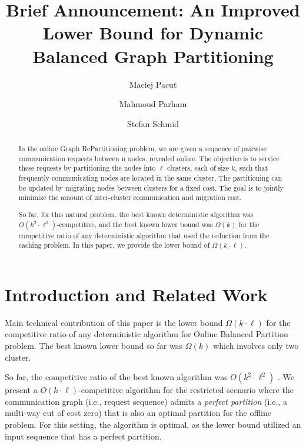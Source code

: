 \documentclass[manuscript,screen=true]{acmart}
\title{Brief Announcement: An Improved Lower Bound for Dynamic Balanced Graph Partitioning}
\author{Maciej Pacut}
\affiliation{%
  \institution{Faculty of Computer Science, University of Vienna}
  \country{Austria}
}
\author{Mahmoud Parham}
\affiliation{%
  \institution{Faculty of Computer Science, University of Vienna}
  \country{Austria}
}
\author{Stefan Schmid}
\affiliation{%
  \institution{Faculty of Computer Science, University of Vienna}
  \country{Austria}
}
\begin{document}
\begin{abstract}
  In the online Graph RePartitioning problem, we are given a sequence of pairwise communication requests between n nodes, revealed online.
  The objective is to service these requests by partitioning the nodes into $\ell$ clusters, each of size $k$, such that frequently communicating nodes are located in the same cluster.
  The partitioning can be updated by migrating nodes between clusters for a fixed cost.
  The goal is to jointly minimize the amount of inter-cluster communication and migration cost.

  So far, for this natural problem, the best known deterministic algorithm was $O(k^2\cdot \ell^2)$-competitive, and the best known lower bound was $\Omega(k)$ for the competitive ratio of any deterministic algorithm that used the reduction from the caching problem.
  In this paper, we provide the lower bound of $\Omega(k\cdot \ell)$.
\end{abstract}
    
\maketitle
    
\renewcommand{\shortauthors}{M.~Pacut, M.~Parham, S.~Schmid}

\section{Introduction and Related Work}


Main technical contribution of this paper is the lower bound $\Omega(k\cdot\ell)$ for the competitive ratio of any deterministic algorithm for Online Balanced Partition problem.
The best known lower bound so far was $\Omega(k)$ \cite{repartition-disc}
which involves only two cluster.


So far, the competitive ratio of the best known algorithm was $O(k^2\cdot \ell^2)$ \cite{repartition-disc}.
We present a $O(k\cdot \ell)$-competitive algorithm for the restricted scenario
where the communication graph (i.e., request sequence) admits a \emph{perfect partition} (i.e., a multi-way cut of cost zero) that is also an optimal partition for the offline problem.
For this setting, the algorithm is optimal, as the lower bound utilized an input sequence that has a perfect partition.
\end{document}
